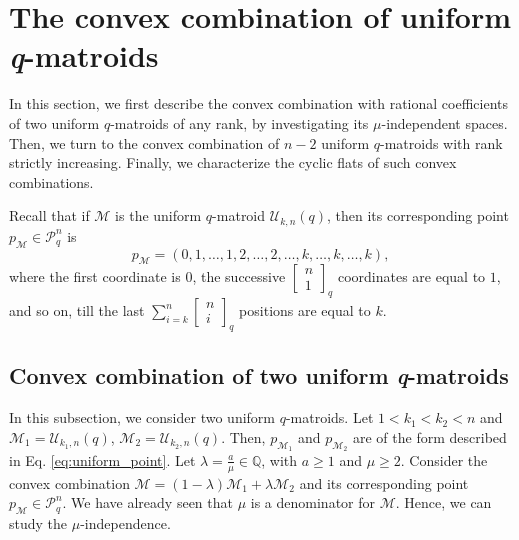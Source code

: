\documentclass[a4paper,11pt,reqno]{amsart}
\theoremstyle{definition}
\newcommand{\mM}{\mathcal{M}}
\newcommand{\mU}{\mathcal{U}}
\newcommand{\RP}{\mathcal{P}_q^n}
\newcommand\qqbin[2]{\left[\begin{matrix} #1 \\ #2 \end{matrix} \right]}
\begin{document}
{%

\section{The convex combination of uniform \emph{q}-matroids}\label{sec: uniform_conv_comb}


In this section, we first describe the convex combination with rational coefficients of two uniform $q$-matroids of any rank, by investigating its $\mu$-independent spaces. Then, we turn to the convex combination of $n-2$ uniform $q$-matroids with rank strictly increasing. Finally, we characterize the cyclic flats of such convex combinations.

Recall that if $\mM$ is the uniform $q$-matroid $\mU_{k,n}(q)$, then its corresponding point $p_\mM\in\RP$ is 
\begin{equation}\label{eq:uniform_point}
    p_\mM=(0,1,\ldots,1,2,\ldots,2,\ldots,k,\ldots,k,\dots,k),
\end{equation}
where the first coordinate is $0$, the successive $\qqbin{n}{1}_q$ coordinates are equal to $1$, and so on, till the last $\sum\limits_{i=k}^n\qqbin{n}{i}_q$ positions are equal to $k$.


\subsection{Convex combination of two uniform \emph{q}-matroids}


In this subsection, we consider two uniform $q$-matroids. Let $1< k_1<k_2<n$ and
$\mM_1=\mU_{k_1,n}(q)$, $\mM_2=\mU_{k_2,n}(q)$. Then, $p_{\mM_1}$ and $p_{\mM_2}$ are of the form described in Eq. \eqref{eq:uniform_point}.
Let $\lambda=\frac{a}{\mu}\in\mathbb{Q}$, with $a\geq 1$ and $\mu\geq 2$. Consider the convex combination $\mM=(1-\lambda)\mM_1+\lambda\mM_2$ and its corresponding point $p_\mM\in\RP$. We have already seen that $\mu$ is a denominator for $\mM$. Hence, we can study the $\mu$-independence.



}
\end{document}
